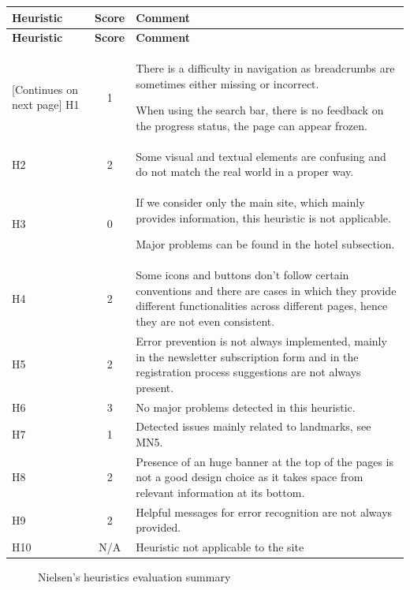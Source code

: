 \begin{tabularx}{\linewidth}{l c X}
\toprule
\textbf{Heuristic} & \textbf{Score} & \textbf{Comment} \\
\midrule
\endfirsthead
\toprule
\textbf{Heuristic} & \textbf{Score} & \textbf{Comment} \\
\midrule
\endhead
\midrule
\footnotesize [Continues on next page]
\endfoot
\bottomrule
\endlastfoot
    H1 & 1 & There is a difficulty in navigation as breadcrumbs are sometimes either missing or incorrect.\par When using the search bar, there is no feedback on the progress status, the page can appear frozen. \\ \midrule
    H2 & 2 & Some visual and textual elements are confusing and do not match the real world in a proper way.\\ \midrule
    H3 & 0 & If we consider only the main site, which mainly provides information, this heuristic is not applicable.\par Major problems can be found in the hotel subsection.\\ \midrule
    H4 & 2 & Some icons and buttons don't follow certain conventions and there are cases in which they provide different functionalities across different pages, hence they are not even consistent.\\ \midrule
    H5 & 2 & Error prevention is not always implemented, mainly in the newsletter subscription form and in the registration process suggestions are not always present.\\ \midrule
    H6 & 3 & No major problems detected in this heuristic.\\ \midrule
    H7 & 1 & Detected issues mainly related to landmarks, see MN5.\\ \midrule
    H8 & 2 & Presence of an huge banner at the top of the pages is not a good design choice as it takes space from relevant information at its bottom.\\ \midrule
    H9 & 2 & Helpful messages for error recognition are not always provided.\\ \midrule
    H10 & N/A & Heuristic not applicable to the site
\end{tabularx}

\begin{figure}[!ht]
    \begin{minipage}{\linewidth}
        \centering
        \captionsetup{justification=centering}
        \caption{Nielsen's heuristics evaluation summary}
        \label{BarsNielsenCrop}
    \end{minipage}
\end{figure}

